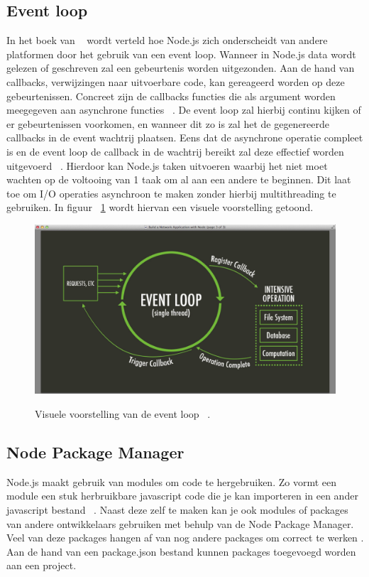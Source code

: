 \subsection{Event loop}
In het boek van ~\textcite{Ali2013} wordt verteld hoe Node.js zich onderscheidt van andere platformen door het gebruik van een event loop.
Wanneer in Node.js data wordt gelezen of geschreven zal een gebeurtenis worden uitgezonden. 
Aan de hand van callbacks, verwijzingen naar uitvoerbare code, kan gereageerd worden op deze gebeurtenissen. 
Concreet zijn de callbacks functies die als argument worden meegegeven aan asynchrone functies ~\autocite{Kumar2023}. 
De event loop zal hierbij continu kijken of er gebeurtenissen voorkomen, en wanneer dit zo is zal het de gegenereerde callbacks in de event wachtrij plaatsen.
Eens dat de asynchrone operatie compleet is en de event loop de callback in de wachtrij bereikt zal deze effectief worden uitgevoerd ~\autocite{Kumar2023}.
Hierdoor kan Node.js taken uitvoeren waarbij het niet moet wachten op de voltooing van 1 taak om al aan een andere te beginnen. 
Dit laat toe om I/O operaties asynchroon te maken zonder hierbij multithreading te gebruiken.
In figuur ~\ref{fig:eventloop} wordt hiervan een visuele voorstelling getoond.
\begin{figure}[h]
    \centering
    \includegraphics[width=.9\textwidth]{graphics/eventloop.png}
    \caption{\label{fig:eventloop}}Visuele voorstelling van de event loop ~\autocite{Luxembourg2023}.
\end{figure}

\subsection{Node Package Manager}
Node.js maakt gebruik van modules om code te hergebruiken. 
Zo vormt een module een stuk herbruikbare javascript code 
die je kan importeren in een ander javascript bestand ~\autocite{Semah2022}.
Naast deze zelf te maken kan je ook modules of packages van andere ontwikkelaars gebruiken met behulp van de Node Package Manager.
Veel van deze packages hangen af van nog andere packages om correct te werken \autocite{kula2017}.
Aan de hand van een package.json bestand kunnen packages toegevoegd worden aan een project.

